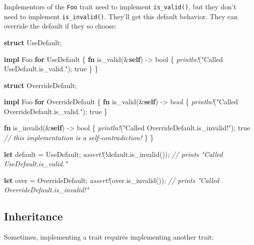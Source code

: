 \documentclass[a4paper,]{book}
\newenvironment{Shaded}{\begin{snugshade}}{\end{snugshade}}
\newcommand{\KeywordTok}[1]{\textcolor[rgb]{0.13,0.29,0.53}{\textbf{{#1}}}}
\newcommand{\DataTypeTok}[1]{\textcolor[rgb]{0.13,0.29,0.53}{{#1}}}
\newcommand{\ConstantTok}[1]{\textcolor[rgb]{0.00,0.00,0.00}{{#1}}}
\newcommand{\StringTok}[1]{\textcolor[rgb]{0.31,0.60,0.02}{{#1}}}
\newcommand{\CommentTok}[1]{\textcolor[rgb]{0.56,0.35,0.01}{\textit{{#1}}}}
\newcommand{\PreprocessorTok}[1]{\textcolor[rgb]{0.56,0.35,0.01}{\textit{{#1}}}}
\newcommand{\NormalTok}[1]{{#1}}
\begin{document}
Implementors of the \texttt{Foo} trait need to implement
\texttt{is\_valid()}, but they don't need to implement
\texttt{is\_invalid()}. They'll get this default behavior. They can
override the default if they so choose:

\begin{Shaded}
\begin{Highlighting}[]
\KeywordTok{struct} \NormalTok{UseDefault;}

\KeywordTok{impl} \NormalTok{Foo }\KeywordTok{for} \NormalTok{UseDefault \{}
    \KeywordTok{fn} \NormalTok{is_valid(&}\KeywordTok{self}\NormalTok{) -> }\DataTypeTok{bool} \NormalTok{\{}
        \PreprocessorTok{println!}\NormalTok{(}\StringTok{"Called UseDefault.is_valid."}\NormalTok{);}
        \ConstantTok{true}
    \NormalTok{\}}
\NormalTok{\}}

\KeywordTok{struct} \NormalTok{OverrideDefault;}

\KeywordTok{impl} \NormalTok{Foo }\KeywordTok{for} \NormalTok{OverrideDefault \{}
    \KeywordTok{fn} \NormalTok{is_valid(&}\KeywordTok{self}\NormalTok{) -> }\DataTypeTok{bool} \NormalTok{\{}
        \PreprocessorTok{println!}\NormalTok{(}\StringTok{"Called OverrideDefault.is_valid."}\NormalTok{);}
        \ConstantTok{true}
    \NormalTok{\}}

    \KeywordTok{fn} \NormalTok{is_invalid(&}\KeywordTok{self}\NormalTok{) -> }\DataTypeTok{bool} \NormalTok{\{}
        \PreprocessorTok{println!}\NormalTok{(}\StringTok{"Called OverrideDefault.is_invalid!"}\NormalTok{);}
        \ConstantTok{true} \CommentTok{// this implementation is a self-contradiction!}
    \NormalTok{\}}
\NormalTok{\}}

\KeywordTok{let} \NormalTok{default = UseDefault;}
\PreprocessorTok{assert!}\NormalTok{(!default.is_invalid()); }\CommentTok{// prints "Called UseDefault.is_valid."}

\KeywordTok{let} \NormalTok{over = OverrideDefault;}
\PreprocessorTok{assert!}\NormalTok{(over.is_invalid()); }\CommentTok{// prints "Called OverrideDefault.is_invalid!"}
\end{Highlighting}
\end{Shaded}

\subsection{Inheritance}\label{inheritance}

Sometimes, implementing a trait requires implementing another trait:
\end{document}
